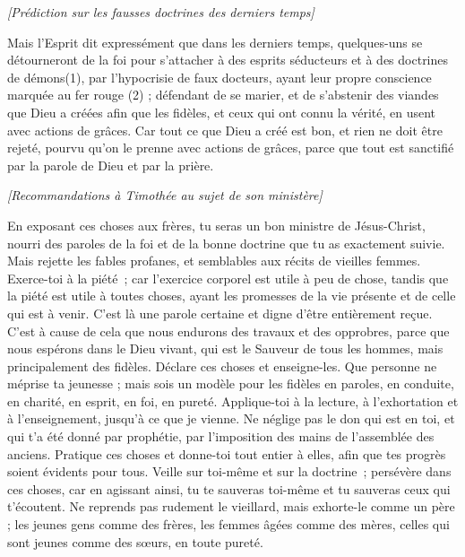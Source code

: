 \begin{multicols}{2}
\begin{center}
\textit{[Prédiction sur les fausses doctrines des derniers temps]}
\end{center}
\VerseOne{}Mais l'Esprit dit expressément que dans les derniers temps, quelques-uns se détourneront de la foi pour s’attacher à des esprits séducteurs et à des doctrines de démons(1),
par l’hypocrisie de faux docteurs, ayant leur propre conscience marquée au fer rouge (2) ;
défendant de se marier, et de s'abstenir des viandes que Dieu a créées afin que les fidèles, et ceux qui ont connu la vérité, en usent avec actions de grâces.
Car tout ce que Dieu a créé est bon, et rien ne doit être rejeté, pourvu qu’on le prenne avec actions de grâces,
parce que tout est sanctifié par la parole de Dieu et par la prière.
\begin{center}
\textit{[Recommandations à Timothée au sujet de son ministère]}
\end{center}
\PPE{}
En exposant ces choses aux frères, tu seras un bon ministre de Jésus-Christ, nourri des paroles de la foi et de la bonne doctrine que tu as exactement suivie.
Mais rejette les fables profanes, et semblables aux récits de vieilles femmes.
Exerce-toi à la piété ; car l'exercice corporel est utile à peu de chose, tandis que la piété est utile à toutes choses, ayant les promesses de la vie présente et de celle qui est à venir.
C'est là une parole certaine et digne d'être entièrement reçue.
C’est à cause de cela que nous endurons des travaux et des opprobres, parce que nous espérons dans le Dieu vivant, qui est le Sauveur de tous les hommes, mais principalement des fidèles.
Déclare ces choses et enseigne-les.
Que personne ne méprise ta jeunesse ; mais sois un modèle pour les fidèles en paroles, en conduite, en charité, en esprit, en foi, en pureté.
Applique-toi à la lecture, à l'exhortation et à l’enseignement, jusqu'à ce que je vienne.
Ne néglige pas le don qui est en toi, et qui t'a été donné par prophétie, par l'imposition des mains de l’assemblée des anciens.
Pratique ces choses et donne-toi tout entier à elles, afin que tes progrès soient évidents pour tous.
Veille sur toi-même et sur la doctrine ; persévère dans ces choses, car en agissant ainsi, tu te sauveras toi-même et tu sauveras ceux qui t'écoutent.
\VerseOne{}Ne reprends pas rudement le vieillard, mais exhorte-le comme un père ; les jeunes gens comme des frères,
les femmes âgées comme des mères, celles qui sont jeunes comme des sœurs, en toute pureté.

\end{multicols}
